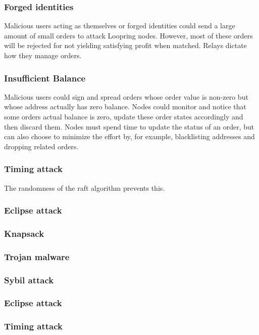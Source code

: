 \documentclass[]{article}
\begin{document}
		\subsubsection{Forged identities}
		Malicious users acting as themselves or forged identities 
		could send a large amount of small orders to attack Loopring
		nodes. However, most of these orders will be rejected 
		for not yielding satisfying profit when matched. 
		Relays dictate how they manage orders.
		
		\subsubsection{Insufficient Balance}
		Malicious users could sign and spread orders whose order 
		value is non-zero but whose address actually has zero 
		balance. Nodes could monitor and notice that some orders 
		actual balance is zero, update these order states accordingly
		and then discard them. Nodes must spend time to update
		the status of an order, but can also choose to minimize the
		effort by, for example, blacklisting addresses and dropping
		related orders.
		
		\subsubsection{Timing attack} 
		The randomness of the raft algorithm prevents this.
		
		\subsubsection{Eclipse attack}
		
		\subsubsection{Knapsack}  
		\subsubsection{Trojan malware} 
		\subsubsection{Sybil attack }
		\subsubsection{Eclipse attack} 
		\subsubsection{Timing attack }
\end{document}
